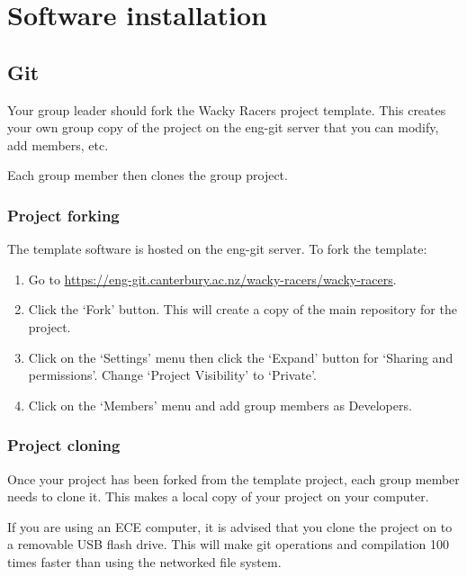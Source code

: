 \chapter{Software installation}
\label{software}



\section{Git}

Your group leader should fork the Wacky Racers project template.  This
creates your own group copy of the project on the eng-git server that
you can modify, add members, etc.

Each group member then clones the group project.


\subsection{Project forking}
\label{project-forking}

The template software is hosted on the eng-git  server.
To fork the template:

\begin{enumerate}
\item
  Go to \url{https://eng-git.canterbury.ac.nz/wacky-racers/wacky-racers}.
\item
  Click the `Fork' button. This will create a copy of the main repository
  for the project.
\item
  Click on the `Settings' menu then click the `Expand' button for
  `Sharing and permissions'. Change `Project Visibility' to `Private'.
\item
  Click on the `Members' menu and add group members as Developers.
\end{enumerate}


\subsection{Project cloning}
\label{project-cloning}

Once your project has been forked from the template project, each group
member needs to clone it. This makes a local copy of your project on
your computer.

If you are using an ECE computer, it is advised that you clone the
project on to a removable USB flash drive. This will make git
operations and compilation 100 times faster than using the networked
file system.

